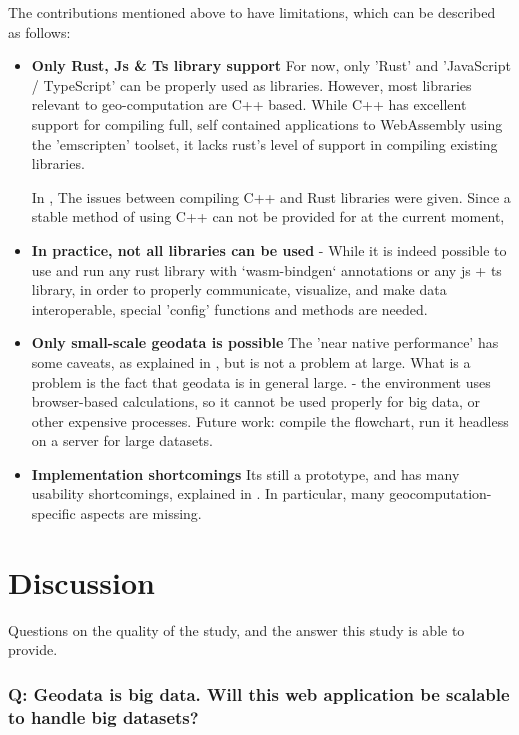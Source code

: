The contributions mentioned above to have limitations, which can be described as follows:

\begin{itemize}[-]
  \item \textbf{Only Rust, Js \& Ts library support}
For now, only 'Rust' and 'JavaScript / TypeScript' can be properly used as libraries. However, most libraries relevant to geo-computation are C++ based. While C++ has excellent support for compiling full, self contained applications to WebAssembly using the 'emscripten' toolset, it lacks rust's level of support in compiling existing libraries.

    In , The issues between compiling C++ and Rust libraries were given. 
    Since a stable method of using C++ can not be provided for at the current moment,
  \item \textbf{In practice, not all libraries can be used }
  - While it is indeed possible to use and run any rust library with `wasm-bindgen` annotations or any js + ts library, in order to properly communicate, visualize, and make data interoperable, special 'config' functions and methods are needed. 
  \item \textbf{Only small-scale geodata is possible}
    The 'near native performance' has some caveats, as explained in , but is not a problem at large. 
    What is a problem is the fact that geodata is in general large.  
    - the environment uses browser-based calculations, so it cannot be used properly for big data, or other expensive processes.
    Future work: compile the flowchart, run it headless on a server for large datasets.
  
  \item \textbf{Implementation shortcomings} 
    Its still a prototype, and has many usability shortcomings, explained in .
    In particular, many geocomputation-specific aspects are missing. 
\end{itemize}

\section{Discussion}
\label{sec:discussion}
Questions on the quality of the study, and the answer this study is able to provide.

\subsubsection*{Q: Geodata is big data. Will this web application be scalable to handle big datasets?}

